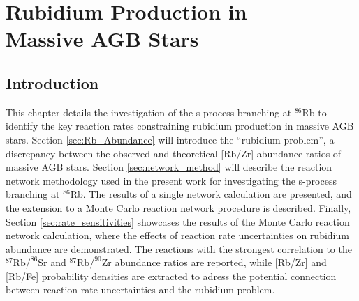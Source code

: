 \chapter[Rubidium Production in Massive AGB Stars]{\textbf{Rubidium Production in \\ Massive AGB Stars}}
\label{ch:Rb}



\section{Introduction}


This chapter details the investigation of the s-process branching at $^{86}$Rb to identify the key reaction rates constraining rubidium production in massive AGB stars. Section \ref{sec:Rb_Abundance} will introduce the ``rubidium problem'', a discrepancy between the observed and theoretical [Rb/Zr] abundance ratios of massive AGB stars. Section \ref{sec:network_method} will describe the reaction network methodology used in the present work for investigating the s-process branching at $^{86}$Rb. The results of a single network calculation are presented, and the extension to a Monte Carlo reaction network procedure is described. Finally, Section \ref{sec:rate_sensitivities} showcases the results of the Monte Carlo reaction network calculation, where the effects of reaction rate uncertainties on rubidium abundance are demonstrated. The reactions with the strongest correlation to the $^{87}\mathrm{Rb}/^{86}\mathrm{Sr}$ and $^{87}\mathrm{Rb}/^{90}\mathrm{Zr}$ abundance ratios are reported, while [Rb/Zr] and [Rb/Fe] probability densities are extracted to adress the potential connection between reaction rate uncertainties and the rubidium problem. %

